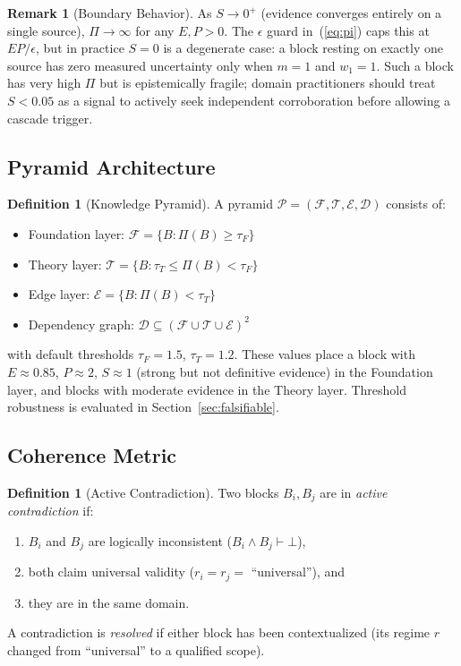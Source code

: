 \documentclass[11pt,a4paper]{article}
\theoremstyle{definition}
\newtheorem{definition}[theorem]{Definition}
\newtheorem{remark}[theorem]{Remark}
\newcommand{\tp}{\Pi}
\begin{document}
\begin{remark}[Boundary Behavior]\label{rem:boundary}
As $S \to 0^+$ (evidence converges entirely on a single source), $\tp \to \infty$ for
any $E, P > 0$. The $\epsilon$ guard in~(\ref{eq:pi}) caps this at $EP/\epsilon$, but
in practice $S = 0$ is a degenerate case: a block resting on exactly one source has
zero measured uncertainty only when $m = 1$ and $w_1 = 1$. Such a block has very high
$\tp$ but is epistemically fragile; domain practitioners should treat $S < 0.05$ as a
signal to actively seek independent corroboration before allowing a cascade trigger.
\end{remark}

\subsection{Pyramid Architecture}

\begin{definition}[Knowledge Pyramid]\label{def:pyramid}
A pyramid $\mathcal{P} = (\mathcal{F}, \mathcal{T}, \mathcal{E}, \mathcal{D})$ consists of:
\begin{itemize}[nosep,leftmargin=*]
\item Foundation layer: $\mathcal{F} = \{B : \tp(B) \geq \tau_F\}$
\item Theory layer: $\mathcal{T} = \{B : \tau_T \leq \tp(B) < \tau_F\}$
\item Edge layer: $\mathcal{E} = \{B : \tp(B) < \tau_T\}$
\item Dependency graph: $\mathcal{D} \subseteq (\mathcal{F} \cup \mathcal{T} \cup \mathcal{E})^2$
\end{itemize}
with default thresholds $\tau_F = 1.5$, $\tau_T = 1.2$. These values place a block with
$E \approx 0.85$, $P \approx 2$, $S \approx 1$ (strong but not definitive evidence) in
the Foundation layer, and blocks with moderate evidence in the Theory layer. Threshold
robustness is evaluated in Section~\ref{sec:falsifiable}.
\end{definition}

\subsection{Coherence Metric}

\begin{definition}[Active Contradiction]\label{def:contradiction}
Two blocks $B_i, B_j$ are in \emph{active contradiction} if:
\begin{enumerate}[nosep]
\item $B_i$ and $B_j$ are logically inconsistent ($B_i \wedge B_j \vdash \bot$),
\item both claim universal validity ($r_i = r_j = $ ``universal''), and
\item they are in the same domain.
\end{enumerate}
A contradiction is \emph{resolved} if either block has been contextualized (its regime
$r$ changed from ``universal'' to a qualified scope).
\end{definition}
\end{document}
